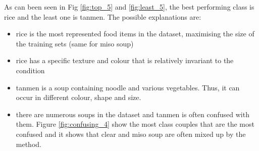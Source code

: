 As can been seen in Fig \ref{fig:top_5} and \ref{fig:least_5}, the best performing class is rice and the least one is tanmen. The possible explanations are:
\begin{itemize}
    \item rice is the most represented food items in the dataset, maximising the size of the training sets (same for miso soup)
    \item rice has a specific texture and colour that is relatively invariant to the condition
    \item tanmen is a soup containing noodle and various vegetables. Thus, it can occur in different colour, shape and size.
    \item there are numerous soups in the dataset and tanmen is often confused with them. Figure \ref{fig:confusing_4} show the most class couples that are the most confused and it shows that clear  and miso soup are often mixed up by the method.
\end{itemize}


